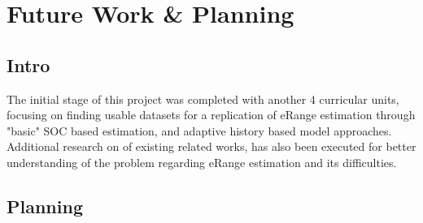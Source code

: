 \chapter{Future Work \& Planning}
\label{cha:planning}

\section{Intro}

The initial stage of this project was
completed with another 4 curricular units,
focusing on finding usable datasets for 
a replication of \gls{eRange} estimation
through "basic" \gls{SOC} based estimation, 
and adaptive history based model approaches.
Additional research on of existing related works,
has also been executed for better understanding
of the problem regarding \gls{eRange} estimation
and its difficulties.

\section{Planning}